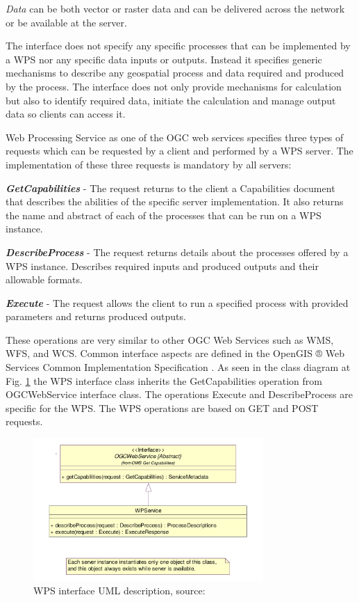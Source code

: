 \documentclass[12pt,a4paper]{article}
\begin{document}
\textit{Data} can be both vector or raster data and can be delivered across the network or be available
at the server.

The interface does not specify any specific processes that can be implemented by a WPS nor any specific
data inputs or outputs. Instead it specifies generic mechanisms to describe any geospatial process and
data required and produced by the process. The interface does not only provide mechanisms for calculation
but also to identify required data, initiate the calculation and manage output data so clients can access it. 

\bigskip
Web Processing Service as one of the OGC web services specifies three types of requests which can be requested
by a client and performed by a WPS server. The implementation of these three requests is mandatory by all servers:

\textbf{\textit{GetCapabilities}} - The request returns to the client a Capabilities document that describes the abilities
of the specific server implementation. It also returns the name and abstract of each of the processes that can
be run on a WPS instance.

\textbf{\textit{DescribeProcess}} - The request returns details about the processes offered by a WPS instance. Describes
required inputs and produced outputs and their allowable formats.

\textbf{\textit{Execute}} - The request allows the client to run a specified process with provided parameters and returns
produced outputs.

\newpage
These operations are very similar to other OGC Web Services such as WMS, WFS, and WCS. Common interface aspects
are defined in the OpenGIS ® Web Services Common Implementation Specification \cite{OGC_common}. As seen in 
the class diagram at \\
Fig. \ref{fig:WPS_class_diagram} the WPS interface class inherits the GetCapabilities operation 
from OGCWebService interface class. The operations Execute and DescribeProcess are specific for the WPS. The WPS
operations are based on GET and POST requests.

\begin{figure}[h!]
\centering
\includegraphics[width=0.78\textwidth]{img/WPS_class_diagram.png}
\caption{WPS interface UML description, source: \cite{WPS_standart_1.0}}
\label{fig:WPS_class_diagram}
\end{figure}
\end{document}
